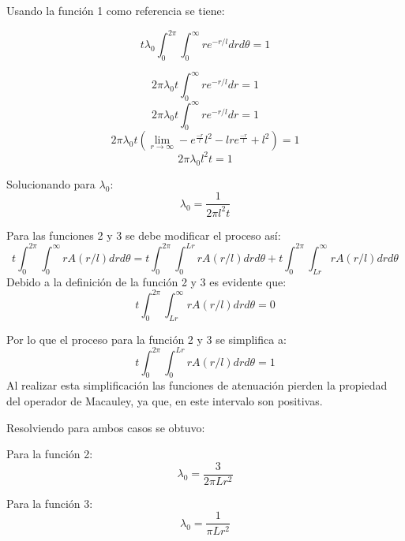 Usando la función 1 como referencia se tiene:

\begin{equation}
	t\lambda_0\int_{0}^{2\pi}\int_{0}^{\infty}{re^{-r/l}}{dr}{d\theta}=1
\end{equation} 

\begin{equation}
	2\pi\lambda_0t\int_{0}^{\infty}{re^{-r/l}}{dr}=1
\end{equation}
\begin{equation}
	2\pi\lambda_0t\int_{0}^{\infty}{re^{-r/l}}{dr}=1
\end{equation} 
\begin{equation}
	2\pi\lambda_0t\left(\lim_{r\to\infty}-e^{\frac{-r}{l}}l^2-lre^{\frac{-r}{l}}+l^2\right)=1
\end{equation} 
\begin{equation}
	2\pi\lambda_0l^2t=1
\end{equation} 

Solucionando para $\lambda_0$:
\begin{equation}
	\lambda_0=\frac{1}{2\pi l^2 t}
\end{equation} 

Para las funciones 2 y 3 se debe modificar el proceso así:
\begin{equation}
	t\int_{0}^{2\pi}\int_{0}^{\infty}{rA(r/l)}{dr}{d\theta}=t\int_{0}^{2\pi}\int_{0}^{Lr}{rA(r/l)}{dr}{d\theta}+t\int_{0}^{2\pi}\int_{Lr}^{\infty}{rA(r/l)}{dr}{d\theta}
\end{equation}
Debido a la definición de la función 2 y 3 es evidente que:
\begin{equation}
	t\int_{0}^{2\pi}\int_{Lr}^{\infty}{rA(r/l)}{dr}{d\theta}=0
\end{equation}

Por lo que el proceso para la función 2 y 3 se simplifica a:
\begin{equation}
	t\int_{0}^{2\pi}\int_{0}^{Lr}{rA(r/l)}{dr}{d\theta}=1
\end{equation}
Al realizar esta simplificación las funciones de atenuación pierden la propiedad del operador de Macauley, ya que, en este intervalo son positivas.

Resolviendo para ambos casos se obtuvo:

Para la función 2:
\begin{equation}
	\lambda_0=\frac{3}{2\pi Lr^2}
\end{equation}

Para la función 3:
\begin{equation}
	\lambda_0=\frac{1}{\pi Lr^2}
\end{equation}

